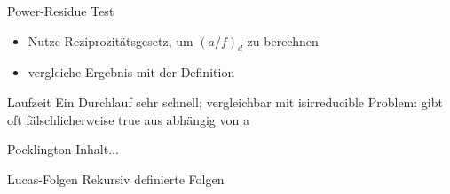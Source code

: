 \documentclass[german,10pt,xcolor=colortbl,compress]{beamer}%
\begin{document}
	
	\begin{frame}{Power-Residue Test}
		\begin{itemize}
		\item Nutze Reziprozitätsgesetz, um $(a/f)_d $ zu berechnen
		\item vergleiche Ergebnis mit der Definition
		\end{itemize}
	\end{frame}

	
	\begin{frame}{Laufzeit}
		Ein Durchlauf sehr schnell; vergleichbar mit isirreducible
		Problem: gibt oft fälschlicherweise true aus
		abhängig von a
		
	\end{frame}

	
	\begin{frame}{Pocklington}
		Inhalt...
	\end{frame}

	\begin{frame}{Lucas-Folgen}
		Rekursiv definierte Folgen 
	\end{frame}
	
\end{document}
